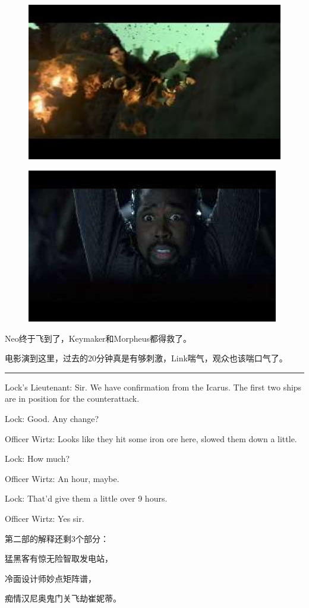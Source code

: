 \documentclass[UTF8]{ctexart}
\newcommand{\myparsep}{\noindent \rule[0.5ex]{\linewidth}{1pt}}
\newenvironment{myquote}{\color{green} \setlength{\leftskip}{6em} \setlength{\rightskip}{4em} \setlength{\parindent}{-2em}}{\par}
\begin{document}
\begin{figure}[htb]
\centering
\includegraphics[width=0.5\linewidth]{fig/read_reloaded-141}
\end{figure}

\begin{figure}[htb]
\centering
\includegraphics[width=0.5\linewidth]{fig/read_reloaded-142}
\end{figure}

Neo终于飞到了，Keymaker和Morpheus都得救了。

电影演到这里，过去的20分钟真是有够刺激，Link喘气，观众也该喘口气了。

\myparsep

\begin{myquote}
Lock's Lieutenant: Sir. We have confirmation from the Icarus. The first two ships are in position for the counterattack.

Lock: Good. Any change?

Officer Wirtz: Looks like they hit some iron ore here, slowed them down a little.

Lock: How much?

Officer Wirtz: An hour, maybe.

Lock: That'd give them a little over 9 hours.

Officer Wirtz: Yes sir.
\end{myquote}

第二部的解释还剩3个部分：

{\centering \it

猛黑客有惊无险智取发电站，

冷面设计师妙点矩阵谱，

痴情汉尼奥鬼门关飞劫崔妮蒂。

}
\end{document}
